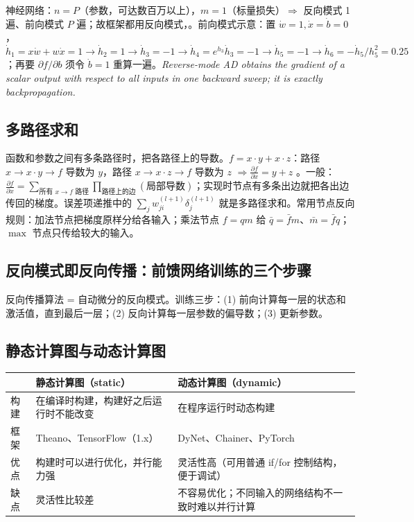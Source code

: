 \noindent 神经网络：$n=P$（参数，可达数百万以上），$m=1$（标量损失）$\Rightarrow$ 反向模式 1 遍、前向模式 $P$ 遍；故框架都用反向模式，。前向模式示意：置 $\dot w=1,\dot x=\dot b=0$，$\dot h_1=x\dot w+w\dot x=1\to\dot h_2=1\to\dot h_3=-1\to\dot h_4=e^{h_3}\dot h_3=-1\to\dot h_5=-1\to\dot h_6=-\dot h_5/h_5^2=0.25$；再要 $\partial f/\partial b$ 须令 $\dot b=1$ 重算一遍。\textit{Reverse-mode AD obtains the gradient of a scalar output with respect to all inputs in one backward sweep; it is exactly backpropagation.}

\subsection{多路径求和}
函数和参数之间有多条路径时，把各路径上的导数。$f=x\cdot y+x\cdot z$：路径 $x\to x\cdot y\to f$ 导数为 $y$，路径 $x\to x\cdot z\to f$ 导数为 $z$ $\Rightarrow\frac{\partial f}{\partial x}=y+z$ 。一般：$\frac{\partial f}{\partial x}=\sum_{\text{所有 }x\to f\text{ 路径}}\prod_{\text{路径上的边}}(\text{局部导数})$；实现时节点有多条出边就把各出边传回的梯度。误差项递推中的 $\sum_jw^{(l+1)}_{ji}\delta^{(l+1)}_j$ 就是多路径求和。常用节点反向规则：加法节点把梯度原样分给各输入；乘法节点 $f=qm$ 给 $\bar q=\bar f m$、$\bar m=\bar f q$；$\max$ 节点只传给较大的输入。

\subsection{反向模式即反向传播：前馈网络训练的三个步骤}
反向传播算法 = 自动微分的反向模式。训练三步：(1) 前向计算每一层的状态和激活值，直到最后一层；(2) 反向计算每一层参数的偏导数；(3) 更新参数。

\subsection{静态计算图与动态计算图}
\noindent\begin{tabularx}{\linewidth}{@{}p{1.6cm}LL@{}}
\toprule
 & 静态计算图（static） & 动态计算图（dynamic） \\
\midrule
构建 & 在编译时构建，构建好之后运行时不能改变 & 在程序运行时动态构建 \\
框架 & Theano、TensorFlow（1.x） & DyNet、Chainer、PyTorch \\
优点 & 构建时可以进行优化，并行能力强 & 灵活性高（可用普通 if/for 控制结构，便于调试） \\
缺点 & 灵活性比较差 & 不容易优化；不同输入的网络结构不一致时难以并行计算 \\
\bottomrule
\end{tabularx}

